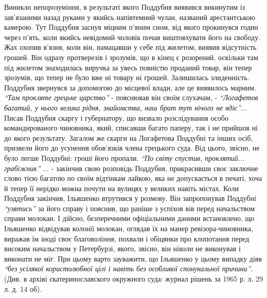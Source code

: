 \documentclass[a4paper,20pt]{report}
\begin{document}
Виникло непорозуміння, в результаті якого Поддубня виявився викинутим із
зав'язаними назад руками у якийсь напівтемний чулан, названий арестантською
камерою. Тут Поддубня заснув міцним п'яним сном, від якого прокинувся годин
через п'ять, коли якийсь невідомий чоловік почав виштовхувати його на свободу.
Жах охопив в'язня, коли він, намацавши у себе під жилетом, виявив відсутність
грошей. Він одразу протверезів і зрозумів, що в кінец є розорений, оскільки там
під жилетом знаходилась виручка за увесь повністю проданий товар, він тепер
зрозумів, що тепер не було вже ні товару ні грошей. Залишилась злиденність.
Поддубня звернувся за допомогою до місцевої влади, але це виявилось марним.
\emph{``Там прокляте грецьке царство''} - пояснював він своїм слухачам, - \emph{``Логафетов
багатий, у нього велика рідня, знайомства, наш брат тут нічого не вдіє''}...
Писав Поддубня скаргу і губернатору, що визвало розслідування особо
командированого чиновника, який, списавши багато паперу, так і не прийшов ні до
якого результату. Загалом же скарги на Логафетова Поддубні та інших осіб,
призвели його до усунення обов'язків члена грецького суда. Від цього, звісно,
не було легше Поддубні: гроші його пропали. \emph{``По світу спустив, проклятий...
грабіжник''} ... - закінчив свою розповідь Поддубня, прикрасивши своє заключне
слово тією багатою по своїм відтінкам лайкою, яка не допускається в печаті,
хоча й тепер її нерідко можна почути на вулицях у великих навіть містах. Коли
Поддубня закінчив, Ільяшенко втрутився у розмову. Він запропонував Поддубні
\emph{``узятись''} за його справу і пояснив, що раніше з успіхов вів перед начальством
справи молокан. І дійсно, безперечними офіціальними даними встановлено, що
Ільяшенко  відвідував колонії молокан, оглядав їх на манер ревізора-чиновника,
виражав їм іноді своє благовоління, похвали і обіцянки про клопотання перед
високим начальством у Петербурзі, якого, звісно, він ніколи не виконував і
виконати не міг. При цьому варто зауважити, що Ільяшенко у цьому випадку діяв
\emph{``без усілякої користолюбної цілі і навіть без особливої спонукальної
причини''}.  (Див. в архіві єкатеринославского окружного суда: журнал рішень за
1965 р. л. 29 л. д. 14 об).
\end{document}
